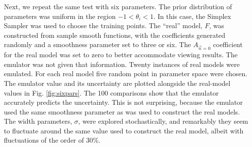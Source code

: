 \documentclass[12pt]{article}
\numberwithin{equation}{section}
\numberwithin{figure}{section}
\begin{document}
Next, we repeat the same test with six parameters. The prior distribution of parameters was uniform in the region $-1<\theta_i<1$. In this case, the Simplex Sampler was used to choose the training points. The ``real'' model, $F$, was constructed from sample smooth functions, with the coefficients generated randomly and a smoothness parameter set to three or six. The $A_{\vec{n}=0}$ coefficient for the real model was set to zero to better accommodate viewing results. The emulator was not given that information. Twenty instances of real models were emulated. For each real model five random point in parameter space were chosen. The emulator value and its uncertainty are plotted alongside the real-model values in Fig. \ref{fig:sixpars}. The 100 comparisons show that the emulator accurately predicts the uncertainty. This is not surprising, because the emulator used the same smoothness parameter as was used to construct the real models. The width parameters, $\sigma$, were explored stochastically, and remarkably they seem to fluctuate around the same value used to construct the real model, albeit with fluctuations of the order of 30\%. 
\end{document}
